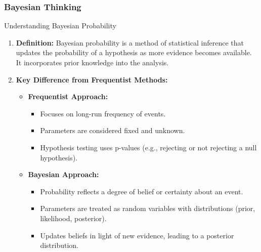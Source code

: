 \documentclass[aspectratio=169]{beamer}
\begin{document}
\begin{frame}[fragile]
    \frametitle{Bayesian Thinking}
    \begin{block}{Understanding Bayesian Probability}
        \begin{enumerate}
            \item \textbf{Definition:} 
                Bayesian probability is a method of statistical inference that updates the probability of a hypothesis as more evidence becomes available. It incorporates prior knowledge into the analysis.
            \item \textbf{Key Difference from Frequentist Methods:}
                \begin{itemize}
                    \item \textbf{Frequentist Approach:}
                        \begin{itemize}
                            \item Focuses on long-run frequency of events.
                            \item Parameters are considered fixed and unknown.
                            \item Hypothesis testing uses p-values (e.g., rejecting or not rejecting a null hypothesis).
                        \end{itemize}
                    \item \textbf{Bayesian Approach:}
                        \begin{itemize}
                            \item Probability reflects a degree of belief or certainty about an event.
                            \item Parameters are treated as random variables with distributions (prior, likelihood, posterior).
                            \item Updates beliefs in light of new evidence, leading to a posterior distribution.
                        \end{itemize}
                \end{itemize}
        \end{enumerate}
    \end{block}
\end{frame}
\end{document}

